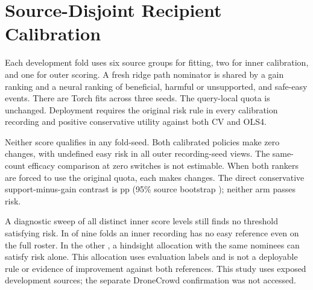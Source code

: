 \section{Source-Disjoint Recipient Calibration}
Each development fold uses six source groups for fitting, two
for inner calibration, and one for outer scoring. A fresh ridge
path nominator is shared by a gain ranking and a neural ranking
of beneficial, harmful or unsupported, and safe-easy events.
There are \NestedRecipientFits{} Torch fits across three seeds.
The query-local quota is unchanged. Deployment requires
the original risk rule in every calibration recording and
positive conservative utility against both CV and OLS4.

Neither score qualifies in any fold-seed. Both calibrated
policies make zero changes, with undefined easy risk in all
\NestedRecipientViews{} outer recording-seed views. The
same-count efficacy comparison at zero switches is not
estimable. When both rankers are forced to use the original
quota, each makes \NestedRecipientActions{} changes. The
direct conservative support-minus-gain contrast is
\NestedRecipientEffect{} pp (95\% source bootstrap
\NestedRecipientInterval); neither arm passes risk.

A diagnostic sweep of all \NestedRecipientLevels{} distinct
inner score levels still finds no threshold satisfying risk.
In \NestedRecipientUnsupported{} of nine folds an inner
recording has no easy reference even on the full roster.
In the other \NestedRecipientSupported{}, a hindsight
allocation with the same nominees can satisfy risk alone.
This allocation uses evaluation labels and is not a
deployable rule or evidence of improvement against both
references. This study uses exposed development sources;
the separate DroneCrowd confirmation was not accessed.
